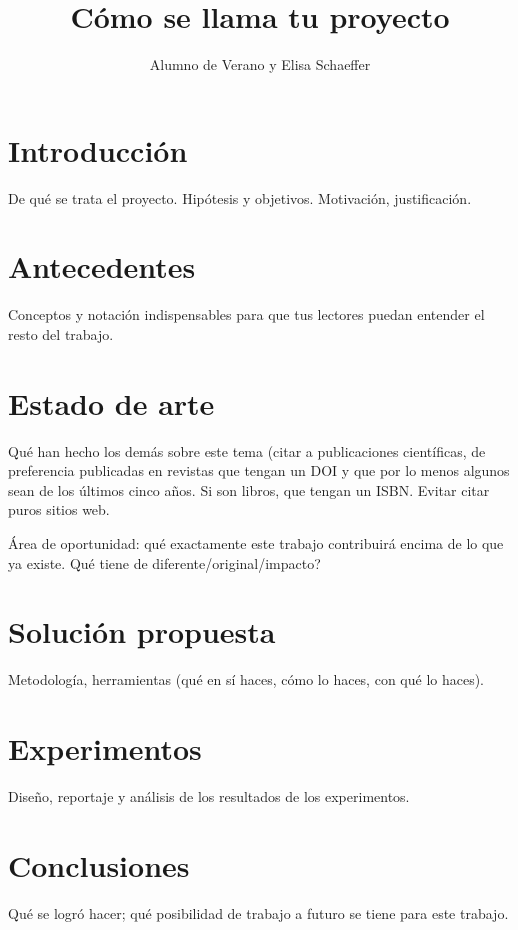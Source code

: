 \documentclass{sciposter}
\title{Cómo se llama tu proyecto}
\author{Alumno de Verano y Elisa Schaeffer}
\institute {Posgrado en Ingeniería de Sistemas}
\begin{document}

\maketitle

\section{Introducción}

De qué se trata el proyecto. Hipótesis y objetivos. Motivación,
justificación.

\section{Antecedentes}

Conceptos y notación indispensables para que tus lectores puedan
entender el resto del trabajo.

\section{Estado de arte}

Qué han hecho los demás sobre este tema (citar a publicaciones
científicas, de preferencia publicadas en revistas que tengan un DOI y
que por lo menos algunos sean de los últimos cinco años. Si son
libros, que tengan un ISBN. Evitar citar puros sitios web.

Área de oportunidad: qué exactamente este trabajo contribuirá encima
de lo que ya existe. {\textquestiondown}Qué tiene de
diferente/original/impacto?

\section{Solución propuesta}

Metodología, herramientas (qué en sí haces, cómo lo haces, con qué lo
haces).

\section{Experimentos}

Diseño, reportaje y análisis de los resultados de los experimentos.

\section{Conclusiones}

Qué se logró hacer; qué posibilidad de trabajo a futuro se tiene para
este trabajo.
\end{document}
